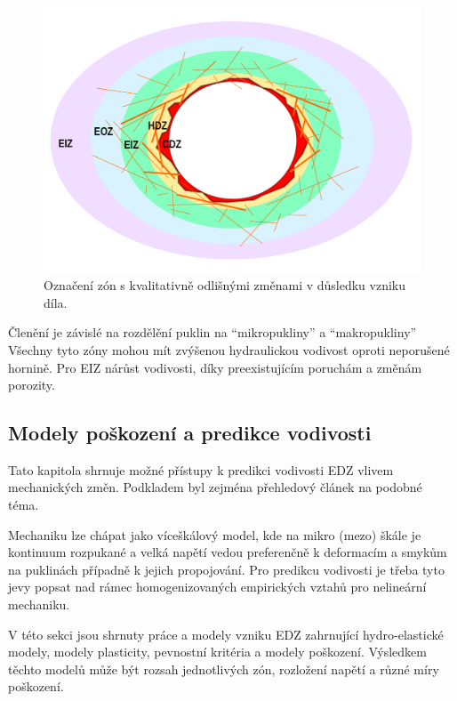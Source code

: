 \documentclass{article}
\begin{document}
\begin{figure}
    \centering
    \includegraphics[width=\textwidth]{graphics/EDZ_structure.pdf}
    \caption{Označení zón s kvalitativně odlišnými změnami v důsledku vzniku díla.}
    \label{fig:edz_zones}
\end{figure}

Členění je závislé na rozdělění puklin na ``mikropukliny'' a ``makropukliny''
Všechny tyto zóny mohou mít zvýšenou hydraulickou vodivost oproti neporušené hornině. Pro EIZ nárůst vodivosti, díky preexistujícím poruchám a změnám porozity.

\subsection{Modely poškození a predikce vodivosti}
Tato kapitola shrnuje možné přístupy k predikci vodivosti EDZ vlivem mechanických změn. Podkladem byl zejména přehledový článek \cite{Shahbazi2020a} na podobné téma. 

Mechaniku lze chápat jako víceškálový model, kde na mikro (mezo) škále je kontinuum rozpukané a velká napětí vedou preferenčně k deformacím a smykům na puklinách případně k jejich propojování. Pro predikcu vodivosti je třeba tyto jevy popsat nad rámec homogenizovaných empirických vztahů pro nelineární mechaniku.






V této sekci jsou shrnuty práce a modely vzniku EDZ zahrnující hydro-elastické modely, modely plasticity, pevnostní kritéria a modely poškození. Výsledkem těchto modelů může být rozsah jednotlivých zón, rozložení napětí a různé míry poškození.
\end{document}
